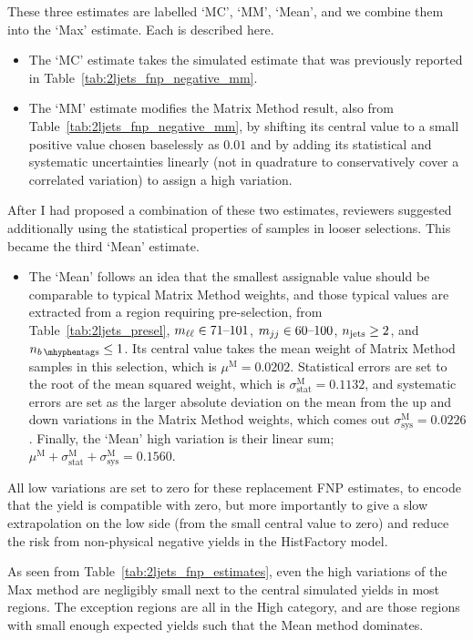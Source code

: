 These three estimates are labelled `MC', `MM', `Mean', and we combine them into
the `Max' estimate.
Each is described here.
\begin{itemize}
\item The `MC' estimate takes the simulated estimate that was previously reported
in Table~\ref{tab:2ljets_fnp_negative_mm}.
\item The `MM' estimate modifies the Matrix Method result,
also from Table~\ref{tab:2ljets_fnp_negative_mm}, by shifting its central
value to a small positive value chosen baselessly as $0.01$ and by adding
its statistical and systematic uncertainties linearly
(not in quadrature to conservatively cover a correlated variation)
to assign a high variation.
\end{itemize}
After I had proposed a combination of these two estimates, reviewers
suggested additionally using the statistical properties of samples in looser
selections.
This became the third `Mean' estimate.
\begin{itemize}
\item The `Mean' follows an idea that the smallest assignable value should
be comparable to typical Matrix Method weights, and those typical values
are extracted from a region requiring pre-selection,
from Table~\ref{tab:2ljets_presel},
$m_{\ell\ell} \in 71\textrm{--}101$,
$m_{jj} \in 60\textrm{--}100$,
$n_\mathrm{jets} \geq 2$, and
$\nbtag \leq 1$.
Its central value takes the mean weight of Matrix Method samples in this
selection, which is $\mu^\textrm{M} = 0.0202$.
Statistical errors are set to the root of the mean squared weight,
which is $\sigma^\textrm{M}_\textrm{stat} = 0.1132$,
and systematic errors are set as the larger absolute deviation on the mean
from the up and down variations in the Matrix Method weights, which comes out
$\sigma^\textrm{M}_\textrm{sys} = 0.0226$.
Finally, the `Mean' high variation is their linear sum;
$\mu^\textrm{M} + \sigma^\textrm{M}_\textrm{stat} +
\sigma^\textrm{M}_\textrm{sys} = 0.1560$.
\end{itemize}
All low variations are set to zero for these replacement FNP estimates, to
encode that the yield is compatible with zero, but more importantly to give
a slow extrapolation on the low side (from the small central value to zero)
and reduce the risk from non-physical negative yields in the HistFactory model.

As seen from Table~\ref{tab:2ljets_fnp_estimates}, even the high variations of
the Max method are negligibly small next to the central simulated yields
in most regions.
The exception regions are all in the High category, and are those regions with
small enough expected yields such that the Mean method dominates.

